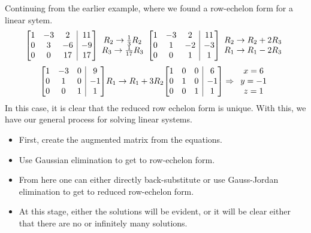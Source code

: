 \documentclass[12pt]{report}
\makeatletter
\newenvironment{amatrix}[1]{%
  \left[\begin{array}{@{}*{#1}{c}|c@{}}
}{%
  \end{array}\right]
}
\makeatother
\begin{document}
\begin{flushleft}
Continuing from the earlier example, where we found a row-echelon form for a
linear sytem.
\[
    \begin{amatrix}{3}
        1 & -3 & 2 & 11 \\
        0 & 3 & -6 & -9 \\
        0 & 0 & 17 & 17 \\
    \end{amatrix}
    \begin{array}{c}
        R_2 \rightarrow \frac{1}{3} R_2 \\
        R_3 \rightarrow \frac{1}{17} R_3
    \end{array}
    \begin{amatrix}{3}
      1 & -3 & 2 & 11 \\
      0 & 1 & -2 & -3 \\
      0 & 0 & 1 & 1 \\
    \end{amatrix}
    \begin{array}{c}
      R_2 \rightarrow R_2 + 2R_3 \\
      R_1 \rightarrow R_1 - 2R_3
    \end{array}
\]
\[
    \begin{amatrix}{3}
      1 & -3 & 0 & 9 \\
      0 & 1 & 0 & -1 \\
      0 & 0 & 1 & 1 \\
    \end{amatrix}
    R_1 \rightarrow R_1 + 3R_2
    \begin{amatrix}{3}
      1 & 0 & 0 & 6 \\
      0 & 1 & 0 & -1 \\
      0 & 0 & 1 & 1 \\
    \end{amatrix}
    \Rightarrow
    \begin{array}{c}
      x = 6 \\
      y = -1 \\
      z = 1 \\
    \end{array}
\]
In this case, it is clear that the reduced row echelon form is unique.
With this, we have our general process for solving linear systems.

\begin{itemize}
    \item First, create the augmented matrix from the equations.
    \item Use Gaussian elimination to get to row-echelon form.
    \item From here one can either directly back-substitute or use Gauss-Jordan
        elimination to get to reduced row-echelon form.
    \item At this stage, either the solutions will be evident, or it will be
        clear either that there are no or infinitely many solutions.
\end{itemize}


\end{flushleft}
\end{document}
